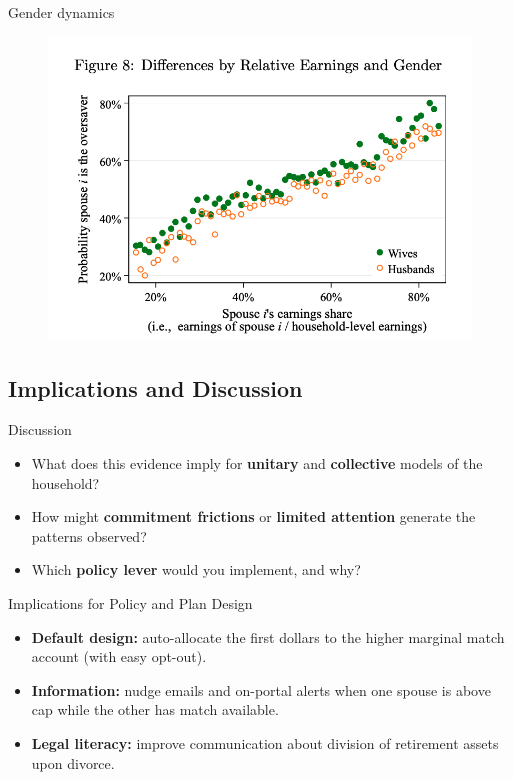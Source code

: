 \documentclass[11pt,notes=hide,aspectratio=169,mathserif]{beamer}
\begin{document}
\begin{frame}{Gender dynamics}
\small
\begin{figure}
\centering
\includegraphics[width=0.7\linewidth]{inputs/fig8.png}
\end{figure}
\end{frame}

\subsection{Implications and Discussion}

\begin{frame}{Discussion}
\small
\begin{itemize}
  \item What does this evidence imply for \textbf{unitary} and \textbf{collective} models of the household? 
  \item How might \textbf{commitment frictions} or \textbf{limited attention} generate the patterns observed?
  \item Which \textbf{policy lever} would you implement, and why?
\end{itemize}
\end{frame}

\begin{frame}{Implications for Policy and Plan Design}
\small
\begin{itemize}
  \item \textbf{Default design:} auto-allocate the first dollars to the higher marginal match account (with easy opt-out).
  \item \textbf{Information:} nudge emails and on-portal alerts when one spouse is above cap while the other has match available.
  \item \textbf{Legal literacy:} improve communication about division of retirement assets upon divorce.
\end{itemize}
\end{frame}
\end{document}

